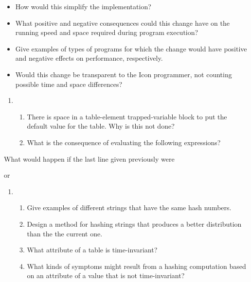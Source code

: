 \liststyleLviii
\begin{itemize}
\item How would this simplify the implementation?

\item What positive and negative consequences could this change have
on the running speed and space required during program execution?

\item Give examples of types of programs for which the change would
have positive and negative effects on performance, respectively.

\item Would this change be transparent to the Icon programmer, not
counting possible time and space differences?
\end{itemize}
\liststyleLix
\begin{enumerate}
\item \begin{enumerate}

\item There is space in a table-element trapped-variable block to put
the default value for the table. Why is this not done?

\item 
What is the consequence of evaluating the following expressions?
\end{enumerate}
\end{enumerate}

What would happen if the last line given previously were


or


\liststyleLx
\begin{enumerate}
\item \begin{enumerate}

\item Give examples of different strings that have the same hash numbers.

\item Design a method for hashing strings that produces a better
distribution than the the current one.

\item What attribute of a table is time-invariant?

\item What kinds of symptoms might result from a hashing computation
 based on an attribute of a value that is not time-invariant?

\end{enumerate}
\end{enumerate}
